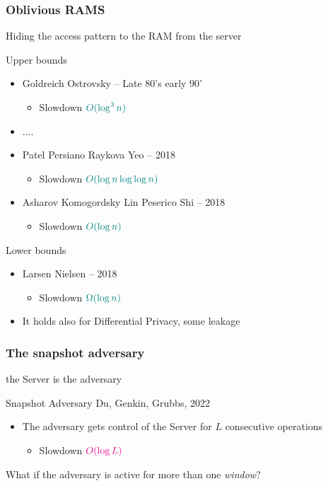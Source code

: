 \documentclass[]{beamer}
\begin{document}
\begin{frame}
\frametitle{Oblivious RAMS}

Hiding the access pattern to the RAM from the server

\begin{block}{Upper bounds}
\begin{itemize}
\item Goldreich Ostrovsky -- Late 80's early 90'
    \begin{itemize}
        \item Slowdown $\color{teal}O(\log^3 n)$
    \end{itemize}
\item ....
\item Patel Persiano Raykova Yeo --  2018 
    \begin{itemize}
        \item Slowdown $\color{teal}O(\log n\log\log n)$
    \end{itemize}
\item Asharov Komogordsky Lin Peserico Shi --  2018 
    \begin{itemize}
        \item Slowdown $\color{teal}O(\log n)$
    \end{itemize}
\end{itemize}
\end{block}

\pause
\begin{block}{Lower bounds}
\begin{itemize}
\item Larsen Nielsen -- 2018
    \begin{itemize}
        \item Slowdown $\color{teal}\Omega(\log n)$
    \end{itemize}
\item It holds also for Differential Privacy, some leakage
\end{itemize}
\end{block}
\end{frame}

\begin{frame}
\frametitle{The snapshot adversary}

the {\color{blue} Server} is the adversary

\begin{block}{Snapshot Adversary}
Du, Genkin, Grubbs, 2022

\begin{itemize}
\item The adversary gets control of the {\color{blue} Server}
for $L$ {\color{red} consecutive} operations
\begin{itemize}
    \item Slowdown $\color{magenta} O(\log L)$
\end{itemize}
\end{itemize}
\end{block}

\pause

\vfill

What if the adversary is active for more than one {\em\color{blue} window}?
\end{frame}
\end{document}
